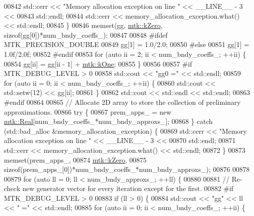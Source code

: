 \begin{DoxyCode}
{{00842     std::cerr << \textcolor{stringliteral}{"Memory allocation exception on line "} << \_\_LINE\_\_ - 3 <<
00843       std::endl;
00844     std::cerr << memory\_allocation\_exception.what() << std::endl;
00845   \}
00846   memset(gg, \hyperlink{group__c01-roots_ga59a451a5fae30d59649bcda274fea271}{mtk::kZero}, \textcolor{keyword}{sizeof}(gg[0])*num\_bndy\_coeffs\_);
00847 
00848 \textcolor{preprocessor}{  #ifdef MTK\_PRECISION\_DOUBLE}
00849   gg[1] = 1.0/2.0;
00850 \textcolor{preprocessor}{  #else}
00851   gg[1] = 1.0f/2.0f;
00852 \textcolor{preprocessor}{  #endif}
00853   \textcolor{keywordflow}{for} (\textcolor{keyword}{auto} ii = 2; ii < num\_bndy\_coeffs\_; ++ii) \{
00854     gg[ii] = gg[ii - 1] + \hyperlink{group__c01-roots_ga26407c24d43b6b95480943340d285c71}{mtk::kOne};
00855   \}
00856 
00857 \textcolor{preprocessor}{  #if MTK\_DEBUG\_LEVEL > 0}
00858   std::cout << \textcolor{stringliteral}{"gg0 ="} << std::endl;
00859   \textcolor{keywordflow}{for} (\textcolor{keyword}{auto} ii = 0; ii < num\_bndy\_coeffs\_; ++ii) \{
00860     std::cout << std::setw(12) << gg[ii];
00861   \}
00862   std::cout << std::endl << std::endl;
00863 \textcolor{preprocessor}{  #endif}
00864 
00865   \textcolor{comment}{// Allocate 2D array to store the collection of preliminary approximations.}
00866   \textcolor{keywordflow}{try} \{
00867     prem\_apps\_ = \textcolor{keyword}{new} \hyperlink{group__c01-roots_gac080bbbf5cbb5502c9f00405f894857d}{mtk::Real}[num\_bndy\_coeffs\_*num\_bndy\_approxs\_];
00868   \} \textcolor{keywordflow}{catch} (std::bad\_alloc &memory\_allocation\_exception) \{
00869     std::cerr << \textcolor{stringliteral}{"Memory allocation exception on line "} << \_\_LINE\_\_ - 3 <<
00870 std::endl;
00871     std::cerr << memory\_allocation\_exception.what() << std::endl;
00872   \}
00873   memset(prem\_apps\_,
00874          \hyperlink{group__c01-roots_ga59a451a5fae30d59649bcda274fea271}{mtk::kZero},
00875          \textcolor{keyword}{sizeof}(prem\_apps\_[0])*num\_bndy\_coeffs\_*num\_bndy\_approxs\_);
00876 
00878 
00879   \textcolor{keywordflow}{for} (\textcolor{keyword}{auto} ll = 0; ll < num\_bndy\_approxs\_; ++ll) \{
00880 
00881     \textcolor{comment}{// Re-check new generator vector for every iteration except for the first.}
00882 \textcolor{preprocessor}{    #if MTK\_DEBUG\_LEVEL > 0}
00883     \textcolor{keywordflow}{if} (ll > 0) \{
00884       std::cout << \textcolor{stringliteral}{"gg"} << ll << \textcolor{stringliteral}{" ="} << std::endl;
00885       \textcolor{keywordflow}{for} (\textcolor{keyword}{auto} ii = 0; ii < num\_bndy\_coeffs\_; ++ii) \{
}}
\end{DoxyCode}
